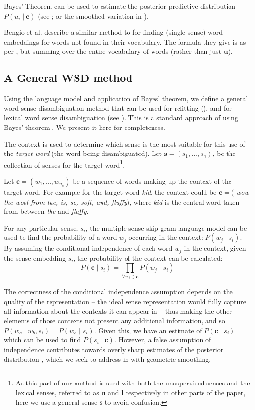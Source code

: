 \documentclass{llncs}
\def\parencite{\cite}
\renewcommand{\c}{\mathbf{c}}
\newcommand{\s}{\mathbf{s}}
\renewcommand{\l}{\mathbf{l}}
\renewcommand{\u}{\mathbf{u}}
\begin{document}
Bayes' Theorem can be used to estimate the posterior predictive distribution $P(u_i \mid \c)$ (see ; or the smoothed variation in ).

Bengio et al. \parencite{NPLM} describe a similar method to  for finding  (single sense) word embeddings for words not found in their vocabulary.
The formula they give is as per , but summing over the entire vocabulary of words (rather than just $\u$).


\subsection{A General WSD method} \label{generalwsd}
Using the language model and application of Bayes' theorem, we define a general word sense disambiguation method that can be used for refitting (), and for lexical word sense disambiguation (see ).
This is a standard approach of using Bayes' theorem \parencite{tian2014probabilistic,AdaGrams}.
We present it here for completeness.

The context is used to determine which sense is the most suitable for this use of the \emph{target word} (the word being disambiguated).
Let $\s=(s_{1},...,s_{n})$, be the collection of senses for the target word\footnote{As this part of our method is used with both the unsupervised senses and the lexical senses, referred to as $\u$ and $\l$ respectively in other parts of the paper, here we use a general sense $\s$ to avoid confusion.}.

Let $\c=(w_{1},...,w_{n_c})$ be a sequence of words making up the context of the target word.
For example for the target word \emph{kid}, the context could be $\c=($ \emph{ wow the wool from the, is, so, soft, and, fluffy}$)$, where \emph{kid} is the central word taken from between \emph{the} and \emph{fluffy}.

For any particular sense, $s_i$, the multiple sense skip-gram language model can be used to find the probability of a word $w_j$ occurring in the context: $P(w_j \mid s_i)$.
By assuming the conditional independence of each word $w_j$ in the context, given the sense embedding $s_i$, the probability of the context can be calculated:
\begin{equation} \label{eq:contextprobtrue}
P(\c \mid s_{i})=\prod_{\forall w_{j}\in\c}P(w_{j} \mid s_{i})
\end{equation}

The correctness of the conditional independence assumption depends on the quality of the representation -- the ideal sense representation would fully capture all information about the contexts it can appear in -- thus making the other elements of those contexts not present any additional information, and so  $P(w_a \mid w_b,s_i)=P(w_a \mid s_i)$.
Given this, we have an estimate of $P(\c \mid s_{i})$ which can be used to find $P(s_i \mid \c)$.
However, a false assumption of independence contributes towards overly sharp estimates of the posterior distribution \cite{rosenfeld2000two}, which we seek to address in  with geometric smoothing.
\end{document}
